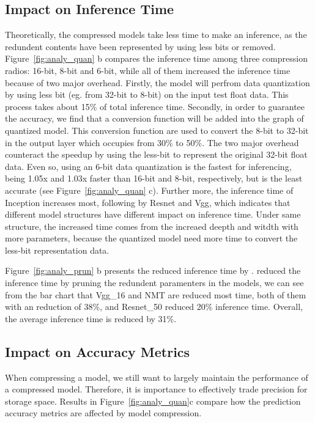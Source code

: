 \subsection{Impact on Inference Time}
Theoretically, the compressed models take less time to make an inference, as 
the redundent contents have been represented by using less bits or removed.
Figure~\ref{fig:analy_quan} b compares the inference time
among three compression radios: 16-bit, 8-bit and 6-bit, while all of them 
increased the inference time because of two major overhead.
Firstly, the model will perfrom data quantization by using less bit (eg. from 32-bit to 8-bit) on
the input test float data. This process takes about 15\% of total inference time.
Secondly, in order to guarantee the accuracy, we find that a conversion function will be added into 
the graph of quantized model. This conversion function are used to convert the 8-bit to 32-bit in the output layer which 
occupies from 30\% to 50\%.
The two major overhead counteract the speedup by using the less-bit to represent the original 32-bit float data. 
Even so, using an 6-bit data quantization is the fastest for inferencing,
being 1.05x and 1.03x faster than 16-bit and 8-bit, respectively, 
but is the least accurate (see Figure~\ref{fig:analy_quan} c). 
Further more, the inference time of Inception increases most, following by Resnet and Vgg,
which indicates that different model structures have different impact on inference time.
Under same structure, the increased time comes from the increaed deepth and witdth with more parameters, 
because the quantized model need more time to convert the less-bit representation data.


Figure~\ref{fig:analy_prun} b presents the reduced inference time by \pruning.
\pruning reduced the inference time by pruning the redundent paramenters in the models,
we can see from the bar chart that
Vgg\_16 and NMT are reduced most time, both of them with an reduction of 38\%, and 
Resnet\_50 reduced 20\% inference time. Overall, the average inference time is reduced by 31\%.


\subsection{Impact on Accuracy Metrics}
When compressing a model, we still want to largely maintain the performance of a compressed model. Therefore, it is importance to
effectively trade precision for storage space. Results in Figure~\ref{fig:analy_quan}c compare how the prediction accuracy metrics are affected by model
compression.

